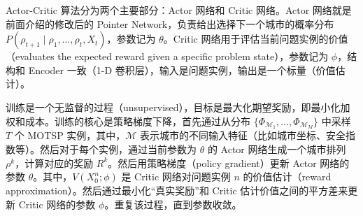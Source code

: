 \documentclass[fontset=none]{ctexart}
\begin{document}
Actor-Critic 算法分为两个主要部分：Actor 网络和 Critic 网络。Actor 网络就是前面介绍的修改后的 Pointer Network，负责给出选择下一个城市的概率分布 $P(\rho_{t + 1} \mid \rho_1, \ldots, \rho_t, X_t)$，参数记为 $\theta$。Critic 网络用于评估当前问题实例的价值（evaluates the expected reward given a specific problem state），参数记为 $\phi$，结构和 Encoder 一致（1-D 卷积层），输入是问题实例，输出是一个标量（价值估计）。

训练是一个无监督的过程（unsupervised），目标是最大化期望奖励，即最小化加权和成本。训练的核心是策略梯度下降，首先通过从分布 $\{\Phi_{\mathcal{M}_1}, \ldots, \Phi_{\mathcal{M}_M}\}$ 中采样 $T$ 个 MOTSP 实例，其中，$\mathcal{M}$ 表示城市的不同输入特征（比如城市坐标、安全指数等）。然后对于每个实例，通过当前参数为 $\theta$ 的 Actor 网络生成一个城市排列 $\rho^k$，计算对应的奖励 $R^k$。然后用策略梯度（policy gradient）更新 Actor 网络的参数 $\theta$\cite{kondaActorCriticAlgorithms1999}。其中，$V(X_0^n; \phi)$ 是 Critic 网络对问题实例 $n$ 的价值估计（reward approximation）。然后通过最小化“真实奖励”和 Critic 估计价值之间的平方差来更新 Critic 网络的参数 $\phi$。重复该过程，直到参数收敛。





\end{document}
